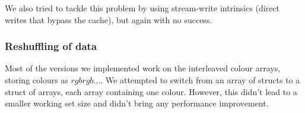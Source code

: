 We also tried to tackle this problem by using stream-write intrinsics (direct writes that bypass the cache), but again with no success.

\subsubsection{Reshuffling of data}

Most of the versions we implemented work on the interleaved colour arrays, storing colours as $rgbrgb\dots$. We attempted to switch from an array of structs to a struct of arrays, each array containing one colour. However, this didn't lead to a smaller working set size and didn't bring any performance improvement. 

%
%
%
%

